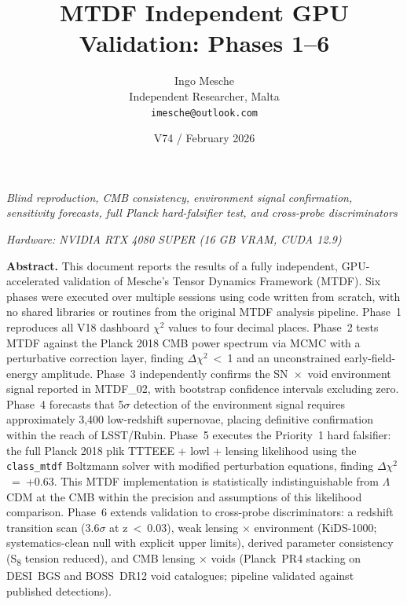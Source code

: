 \documentclass[11pt,a4paper]{article}
\title{MTDF Independent GPU Validation: Phases 1--6}
\author{Ingo Mesche\\ \small Independent Researcher, Malta \\ \small \texttt{imesche@outlook.com}}
\date{V74 / February 2026}
\begin{document}
\maketitle
\begin{center}\itshape Blind reproduction, CMB consistency, environment signal confirmation, sensitivity forecasts, full Planck hard-falsifier test, and cross-probe discriminators\end{center}

\vspace{0.4em}

\begin{center}\itshape Hardware: NVIDIA RTX 4080 SUPER (16 GB VRAM, CUDA 12.9)\end{center}



\begin{mdframed}[linecolor=accent,linewidth=0.5pt,backgroundcolor=callout-bg,leftline=true,rightline=true,topline=true,bottomline=true,innerleftmargin=8pt,innerrightmargin=8pt,innertopmargin=6pt,innerbottommargin=6pt]
\textbf{Abstract.}
This document reports the results of a fully independent, GPU-accelerated validation of Mesche's Tensor Dynamics Framework (MTDF). Six phases were executed over multiple sessions using code written from scratch, with no shared libraries or routines from the original MTDF analysis pipeline. Phase~1 reproduces all V18 dashboard $\chi$$^{2}$ values to four decimal places. Phase~2 tests MTDF against the Planck 2018 CMB power spectrum via MCMC with a perturbative correction layer, finding $\Delta$$\chi$$^{2}$~<~1 and an unconstrained early-field-energy amplitude. Phase~3 independently confirms the SN~$\times$~void environment signal reported in MTDF\_\allowbreak{}02, with bootstrap confidence intervals excluding zero. Phase~4 forecasts that 5$\sigma$ detection of the environment signal requires approximately 3,400 low-redshift supernovae, placing definitive confirmation within the reach of LSST/\allowbreak{}Rubin. Phase~5 executes the Priority~1 hard falsifier: the full Planck 2018 plik TTTEEE + lowl + lensing likelihood using the \texttt{class\_\allowbreak{}mtdf} Boltzmann solver with modified perturbation equations, finding $\Delta$$\chi$$^{2}$~=~+0.63. This MTDF implementation is statistically indistinguishable from $\Lambda$CDM at the CMB within the precision and assumptions of this likelihood comparison. Phase~6 extends validation to cross-probe discriminators: a redshift transition scan (3.6$\sigma$ at z~<~0.03), weak lensing $\times$ environment (KiDS-1000; systematics-clean null with explicit upper limits), derived parameter consistency (S\textsubscript{8} tension reduced), and CMB lensing $\times$ voids (Planck~PR4 stacking on DESI~BGS and BOSS~DR12 void catalogues; pipeline validated against published detections).
\end{mdframed}
\end{document}
